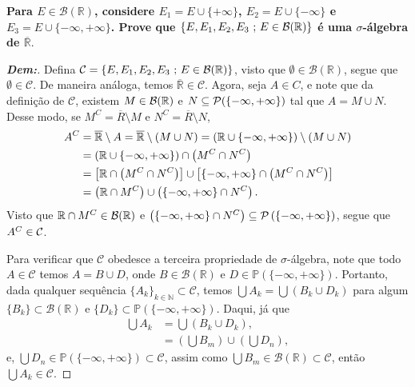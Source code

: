 \newpage
{}
\bigline 
\textbf{Para $E \in \mathcal B(\mathbb R)$, considere $E_1 = E \cup \{+\infty\}$, 
$E_2 = E \cup \{-\infty\}$ e $E_3 = E \cup \{-\infty, +\infty\}$. Prove que 
$\{E, E_1, E_2, E_3\text{ ; }  E\in \mathcal B(\mathbb R)\}$ 
é uma $\sigma$-álgebra de $\overline{\mathbb R}$}. 
\begin{proof}[\textbf{Dem:}] Defina $\mathcal C = \{E, E_1, E_2, E_3\text{ ; }  E
\in \mathcal B(\mathbb R)\}$,
visto que $\emptyset\in \mathcal B(\mathbb R)$, segue que $\emptyset \in \mathcal C$.
De maneira análoga, temos $\overline{\mathbb R} \in \mathcal C$. Agora, seja $A \in C$, 
  e note que da definição de $\mathcal C$, existem $M \in \mathcal B(\mathbb R)$ e 
  $N \subseteq \mathcal P(\{-\infty, +\infty\})$ tal que $A = M \cup N$. Desse modo, 
  se $M^C = \overline R \setminus M$ e $N^C = \overline R \setminus N$,
  \begin{align*}
    A^C &= \overline {\mathbb R} \setminus A = \overline {\mathbb R} \setminus \left(M \cup N\right)
    = \left(\mathbb R \cup \{-\infty, +\infty\}\right) \setminus \left(M \cup N\right)\\
    &= \left(\mathbb R \cup \{-\infty, +\infty\}\right) \cap \left(M^C \cap N^C\right)\\
    &= \left[\mathbb R \cap \left(M^C \cap N^C\right)\right] \cup 
    \left[\{-\infty, +\infty\} \cap \left(M^C \cap N^C\right)\right]\\
    &= \left(\mathbb R \cap M^C\right) \cup \left(\left\{-\infty, +\infty\right\} \cap N^C\right).
  \end{align*}
  Visto que $\mathbb R \cap M^C \in \mathcal B(\mathbb R)$ e 
  $\left(\left\{-\infty, +\infty\right\} \cap N^C\right) \subseteq \mathcal P \left(\left\{-\infty, +\infty\right\}\right)$, 
  segue que $A^C \in \mathcal C$.

  Para verificar que $\mathcal C$ obedesce a terceira propriedade de $\sigma$-álgebra,
note que todo $A \in \mathcal C$ 
temos $A = B \cup D$, onde $B \in \mathcal B (\mathbb R)$ e 
$D \in \mathbb P (\{-\infty, +\infty\}) $. Portanto, dada qualquer 
sequência $\{A_k\}_{k \in \mathbb N}
\subset \mathcal C$, temos $\bigcup A_k = \bigcup \left(B_k \cup D_k\right)$ para algum 
$\{B_k\} \subset \mathcal B (\mathbb R)$ e 
  $\{D_k\}\subset \mathbb P (\{-\infty, +\infty\})$. Daqui, já que 
\begin{align*}
  \bigcup A_k &= \bigcup \left(B_k \cup D_k\right),\\
  &= \left(\bigcup B_m\right) \cup \left(\bigcup D_n\right), 
\end{align*}
e, $\bigcup D_n \in \mathbb P (\{-\infty, +\infty\}) \subset \mathcal C$, assim como 
  $\bigcup B_m \in \mathcal B(\mathbb R) \subset \mathcal C$, então 
  $\bigcup A_k \in \mathcal C$.
\end{proof}
